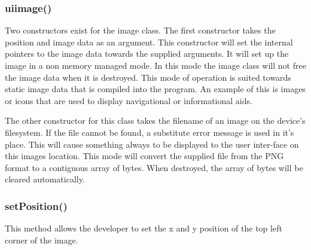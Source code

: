 \subsubsection{uiimage()}

Two constructors exist for the image class. The first constructor takes the position and image data as an argument. This constructor will set the internal pointers to the image data towards the supplied arguments. It will set up the image in a non memory managed mode. In this mode the image class will not free the image data when it is destroyed. This mode of operation is suited towards static image data that is compiled into the program. An example of this is images or icons that are used to display navigational or informational aids.

The other constructor for this class takes the filename of an image on the device's filesystem. If the file cannot be found, a substitute error message is used in it's place. This will cause something always to be displayed to the user inter-face on this images location. This mode will convert the supplied file from the PNG format to a contiguous array of bytes. When destroyed, the array of bytes will be cleared automatically. 


\subsubsection{setPosition()}

This method allows the developer to set the x and y position of the top left corner of the image.


